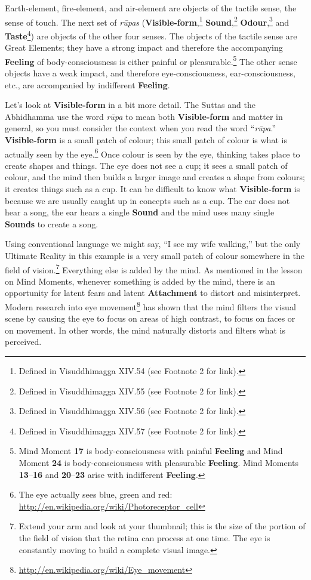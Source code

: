 Earth-element, fire-element, and air-element are objects of the tactile sense, the sense of touch. The next set of \textit{rūpas} (\textbf{Visible-form},\footnote{Defined in Visuddhimagga XIV.54 (see Footnote 2 for link).} \textbf{Sound},\footnote{Defined in Visuddhimagga XIV.55 (see Footnote 2 for link).} \textbf{Odour},\footnote{Defined in Visuddhimagga XIV.56 (see Footnote 2 for link).} and \textbf{Taste}\footnote{Defined in Visuddhimagga XIV.57 (see Footnote 2 for link).}) are objects of the other four senses. The objects of the tactile sense are Great Elements; they have a strong impact and therefore the accompanying \textbf{Feeling} of body-consciousness is either painful or pleasurable.\footnote{Mind Moment \textbf{17} is body-consciousness with painful \textbf{Feeling} and Mind Moment \textbf{24} is body-consciousness with pleasurable \textbf{Feeling}. Mind Moments \textbf{13}--\textbf{16} and \textbf{20}--\textbf{23} arise with indifferent \textbf{Feeling}.} The other sense objects have a weak impact, and therefore eye-consciousness, ear-consciousness, etc., are accompanied by indifferent \textbf{Feeling}.

Let’s look at \textbf{Visible-form} in a bit more detail. The Suttas and the Abhidhamma use the word \textit{rūpa} to mean both \textbf{Visible-form} and matter in general, so you must consider the context when you read the word “\textit{rūpa}.” \textbf{Visible-form} is a small patch of colour; this small patch of colour is what is actually seen by the eye.\footnote{The eye actually sees blue, green and red: \url{http://en.wikipedia.org/wiki/Photoreceptor_cell}} Once colour is seen by the eye, thinking takes place to create shapes and things. The eye does not see a cup; it sees a small patch of colour, and the mind then builds a larger image and creates a shape from colours; it creates things such as a cup. It can be difficult to know what \textbf{Visible-form} is because we are usually caught up in concepts such as a cup. The ear does not hear a song, the ear hears a single \textbf{Sound} and the mind uses many single \textbf{Sounds} to create a song.

\pagebreak

Using conventional language we might say, “I see my wife walking,” but the only Ultimate Reality in this example is a very small patch of colour somewhere in the field of vision.\footnote{Extend your arm and look at your thumbnail; this is the size of the portion of the field of vision that the retina can process at one time. The eye is constantly moving to build a complete visual image.} Everything else is added by the mind. As mentioned in the lesson on Mind Moments, whenever something is added by the mind, there is an opportunity for latent fears and latent \textbf{Attachment} to distort and misinterpret. Modern research into eye movement\footnote{\url{http://en.wikipedia.org/wiki/Eye_movement}} has shown that the mind filters the visual scene by causing the eye to focus on areas of high contrast, to focus on faces or on movement. In other words, the mind naturally distorts and filters what is perceived.

